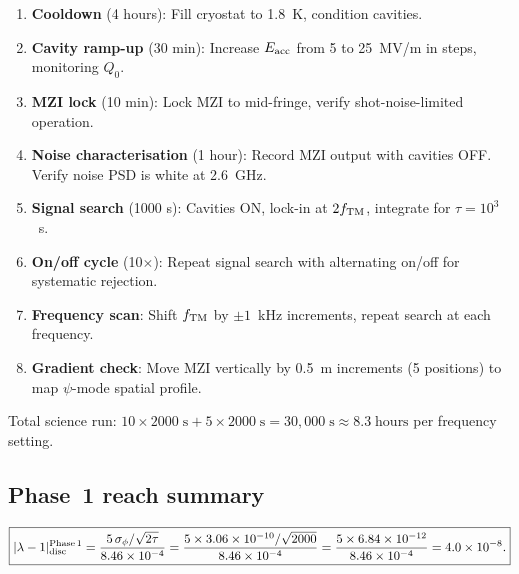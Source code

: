 \documentclass[11pt]{article}
\newcommand{\ee}[1]{\times 10^{#1}}
\newcommand{\lam}{\lambda}
\begin{document}
\begin{enumerate}
\item \textbf{Cooldown} (4 hours): Fill cryostat to 1.8~K,
condition cavities.
\item \textbf{Cavity ramp-up} (30 min): Increase $E_{\rm acc}$
from 5 to 25~MV/m in steps, monitoring $Q_0$.
\item \textbf{MZI lock} (10 min): Lock MZI to mid-fringe,
verify shot-noise-limited operation.
\item \textbf{Noise characterisation} (1 hour): Record MZI output
with cavities OFF. Verify noise PSD is white at 2.6~GHz.
\item \textbf{Signal search} (1000 s): Cavities ON, lock-in at
$2f_{\rm TM}$, integrate for $\tau = 10^3$~s.
\item \textbf{On/off cycle} (10$\times$): Repeat signal search
with alternating on/off for systematic rejection.
\item \textbf{Frequency scan}: Shift $f_{\rm TM}$ by $\pm 1$~kHz
increments, repeat search at each frequency.
\item \textbf{Gradient check}: Move MZI vertically by 0.5~m
increments (5 positions) to map $\psi$-mode spatial profile.
\end{enumerate}

Total science run: $10 \times 2000\;\text{s} + 5 \times 2000\;\text{s}
= 30{,}000\;\text{s} \approx 8.3\;\text{hours}$ per frequency setting.

\subsection{Phase~1 reach summary}

\begin{equation}
\boxed{|\lam-1|_{\rm disc}^{\rm Phase\,1}
= \frac{5\,\sigma_\phi/\sqrt{2\tau}}{8.46\ee{-4}}
= \frac{5 \times 3.06\ee{-10}/\sqrt{2000}}{8.46\ee{-4}}
= \frac{5 \times 6.84\ee{-12}}{8.46\ee{-4}} = 4.0\ee{-8}.}
\label{eq:phase1-reach}
\end{equation}
\end{document}
